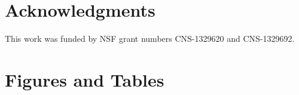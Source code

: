 \documentclass[12pt]{article}
\begin{document}


%
\section*{Acknowledgments}
%
This work was funded by NSF grant numbers CNS-1329620 and CNS-1329692.



%



%

\section*{Figures and Tables}

\end{document}
